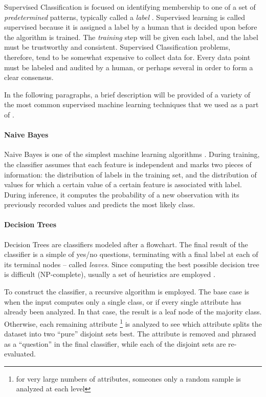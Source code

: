 Supervised Classification is focused on identifying membership to one of a set of \textit{predetermined} patterns, typically called a \textit{label} \cite{liu2007web}. Supervised learning is called supervised because it is assigned a label by a human that is decided upon before the algorithm is trained. The \textit{training} step will be given each label, and the label must be trustworthy and consistent. Supervised Classification problems, therefore, tend to be somewhat expensive to collect data for. Every data point must be labeled and audited by a human, or perhaps several in order to form a clear consensus.

In the following paragraphs, a brief description will be provided of a variety of the most common supervised machine learning techniques that we used as a part of \CREATE. 

\paragraph{Naive Bayes}

Naive Bayes is one of the simplest machine learning algorithms \cite{liu2007web}. During training, the classifier assumes that each feature is independent and marks two pieces of information: the distribution of labels in the training set, and the distribution of values for which a certain value of a certain feature is associated with label. During inference, it computes the probability of a new observation with its previously recorded values and predicts the most likely class.

\paragraph{Decision Trees}

Decision Trees are classifiers modeled after a flowchart. The final result of the classifier is a simple of yes/no questions, terminating with a final label at each of its terminal nodes -- called \textit{leaves}. Since computing the best possible decision tree is difficult (NP-complete), usually a set of heuristics are employed \cite{liu2007web}.

To construct the classifier, a recursive algorithm is employed. The base case is when the input computes only a single class, or if every single attribute has already been analyzed. In that case, the result is a leaf node of the majority class. Otherwise, each remaining attribute \footnote{for very large numbers of attributes, someones only a random sample is analyzed at each level} is analyzed to see which attribute splits the dataset into two ``pure'' disjoint sets best. The attribute is removed and phrased as a ``question'' in the final classifier, while each of the disjoint sets are re-evaluated.

